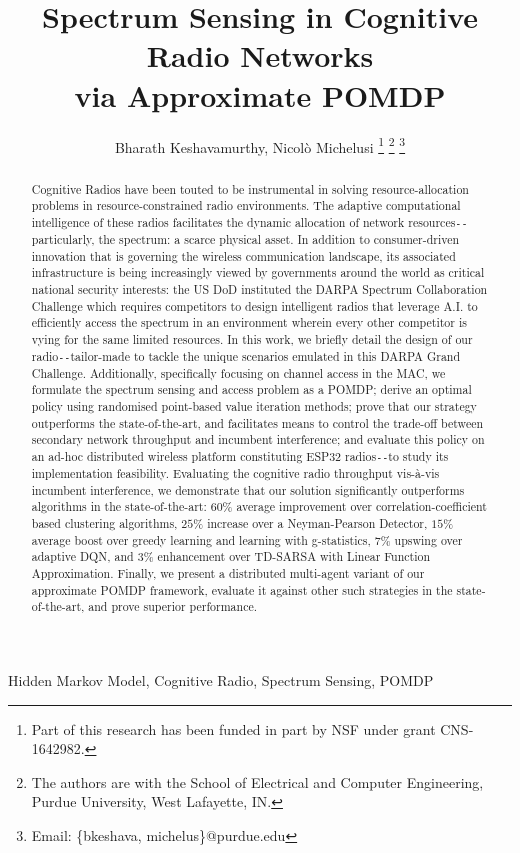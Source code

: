 \documentclass[12pt, draftcls, onecolumn]{IEEEtran}
\title{Spectrum Sensing in Cognitive Radio Networks
\\
via Approximate POMDP}
\author{Bharath Keshavamurthy, Nicol\`{o} Michelusi
\thanks{Part of this research has been funded in part by NSF under grant CNS-1642982.}
\thanks{The authors are with the School of Electrical and Computer Engineering, Purdue University, West Lafayette, IN.}
\thanks{Email: \{bkeshava, michelus\}@purdue.edu}
\vspace{-12mm}}
\begin{document}
\maketitle
\thispagestyle{plain}
\pagestyle{plain} 
\begin{abstract}
Cognitive Radios have been touted to be instrumental in solving resource-allocation problems in resource-constrained radio environments. The adaptive computational intelligence of these radios facilitates the dynamic allocation of network resources\texttt{-{}-}particularly, the spectrum: a scarce physical asset. In addition to consumer-driven innovation that is governing the wireless communication landscape, its associated infrastructure is being increasingly viewed by governments around the world as critical national security interests: the US DoD instituted the DARPA Spectrum Collaboration Challenge which requires competitors to design intelligent radios that leverage A.I. to efficiently access the spectrum in an environment wherein every other competitor is vying for the same limited resources. In this work, we briefly detail the design of our radio\texttt{-{}-}tailor-made to tackle the unique scenarios emulated in this DARPA Grand Challenge. Additionally, specifically focusing on channel access in the MAC, we formulate the spectrum sensing and access problem as a POMDP; derive an optimal policy using randomised point-based value iteration methods; prove that our strategy outperforms the state-of-the-art, and facilitates means to control the trade-off between secondary network throughput and incumbent interference; and evaluate this policy on an ad-hoc distributed wireless platform constituting ESP32 radios\texttt{-{}-}to study its implementation feasibility. Evaluating the cognitive radio throughput vis-à-vis incumbent interference, we demonstrate that our solution significantly outperforms algorithms in the state-of-the-art: $60$\% average improvement over correlation-coefficient based clustering algorithms, $25$\% increase over a Neyman-Pearson Detector, $15$\% average boost over greedy learning and learning with g-statistics, $7$\% upswing over adaptive DQN, and $3$\% enhancement over TD-SARSA with Linear Function Approximation. Finally, we present a distributed multi-agent variant of our approximate POMDP framework, evaluate it against other such strategies in the state-of-the-art, and prove superior performance.
\end{abstract}
\begin{IEEEkeywords}
Hidden Markov Model, Cognitive Radio, Spectrum Sensing, POMDP
\end{IEEEkeywords}
\end{document}
